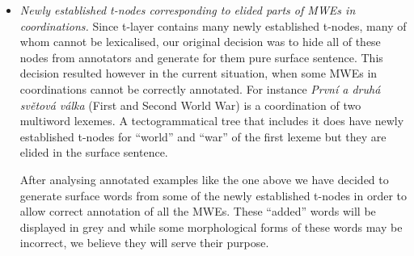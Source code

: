 \begin{itemize}
%
\item {\em Newly established t-nodes corresponding to elided parts of MWEs in coordinations.} Since t-layer contains many newly established t-nodes, many of whom cannot be lexicalised, our original decision was to hide all of these nodes from annotators and generate for them pure surface sentence. This decision resulted however in the current situation, when some MWEs in coordinations cannot be correctly annotated. 
For instance {\em První a druhá světová válka} (First and Second World War) is a coordination of two multiword lexemes. A tectogrammatical tree that includes it does have newly established t-nodes for “world” and “war” of the first lexeme but they are elided in the surface sentence. 

After analysing annotated examples like the one above we have decided to generate surface words from some of the newly established t-nodes in order to allow correct annotation of all the MWEs. These ``added'' words will be displayed in grey and while some morphological forms of these words may be incorrect, we believe they will serve their purpose.

%

\end{itemize}

